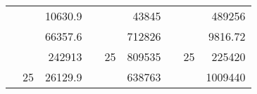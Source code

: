 \begin{table}[]
\begin{tabular}{|ccrccrccc}
\rowcolor[HTML]{DAE8FC} 
\multicolumn{1}{|c|}{\cellcolor[HTML]{FFFFC7}}                                & \multicolumn{1}{c|}{\cellcolor[HTML]{DAE8FC}}                      & \multicolumn{1}{r|}{\cellcolor[HTML]{DAE8FC}10630.9}   & \multicolumn{1}{c|}{\cellcolor[HTML]{FFFFC7}}                                & \multicolumn{1}{c|}{\cellcolor[HTML]{DAE8FC}}                       & \multicolumn{1}{r|}{\cellcolor[HTML]{DAE8FC}43845}     & \multicolumn{1}{c|}{\cellcolor[HTML]{FFFFC7}}                                & \multicolumn{1}{c|}{\cellcolor[HTML]{DAE8FC}}                      & \multicolumn{1}{r|}{\cellcolor[HTML]{DAE8FC}489256}    \\ \cline{3-3} \cline{6-6} \cline{9-9} 
\multicolumn{1}{|c|}{\cellcolor[HTML]{FFFFC7}}                                & \multicolumn{1}{c|}{\cellcolor[HTML]{DAE8FC}}                      & \multicolumn{1}{r|}{\cellcolor[HTML]{DDFDFF}66357.6}   & \multicolumn{1}{c|}{\cellcolor[HTML]{FFFFC7}}                                & \multicolumn{1}{c|}{\cellcolor[HTML]{DAE8FC}}                       & \multicolumn{1}{r|}{\cellcolor[HTML]{DDFDFF}712826}    & \multicolumn{1}{c|}{\cellcolor[HTML]{FFFFC7}}                                & \multicolumn{1}{c|}{\cellcolor[HTML]{DAE8FC}}                      & \multicolumn{1}{r|}{\cellcolor[HTML]{DDFDFF}9816.72}   \\ \cline{3-3} \cline{6-6} \cline{9-9} 
\rowcolor[HTML]{DAE8FC} 
\multicolumn{1}{|c|}{\cellcolor[HTML]{FFFFC7}}                                & \multicolumn{1}{c|}{\cellcolor[HTML]{DAE8FC}}                      & \multicolumn{1}{r|}{\cellcolor[HTML]{DAE8FC}242913}    & \multicolumn{1}{c|}{\cellcolor[HTML]{FFFFC7}}                                & \multicolumn{1}{c|}{\multirow{-9}{*}{\cellcolor[HTML]{DAE8FC}25}}   & \multicolumn{1}{r|}{\cellcolor[HTML]{DAE8FC}809535}    & \multicolumn{1}{c|}{\cellcolor[HTML]{FFFFC7}}                                & \multicolumn{1}{c|}{\multirow{-9}{*}{\cellcolor[HTML]{DAE8FC}25}}  & \multicolumn{1}{r|}{\cellcolor[HTML]{DAE8FC}225420}    \\ \cline{3-3} \cline{5-6} \cline{8-9} 
\multicolumn{1}{|c|}{\cellcolor[HTML]{FFFFC7}}                                & \multicolumn{1}{c|}{\multirow{-10}{*}{\cellcolor[HTML]{DAE8FC}25}} & \multicolumn{1}{r|}{\cellcolor[HTML]{DDFDFF}26129.9}   & \multicolumn{1}{c|}{\cellcolor[HTML]{FFFFC7}}                                & \multicolumn{1}{c|}{\cellcolor[HTML]{DDFDFF}}                       & \multicolumn{1}{r|}{\cellcolor[HTML]{DAE8FC}638763}    & \multicolumn{1}{c|}{\cellcolor[HTML]{FFFFC7}}                                & \multicolumn{1}{c|}{\cellcolor[HTML]{DDFDFF}}                      & \multicolumn{1}{r|}{\cellcolor[HTML]{DAE8FC}1009440}   \\ \cline{2-3} \cline{6-6} \cline{9-9} 

\end{tabular}
\end{table}
